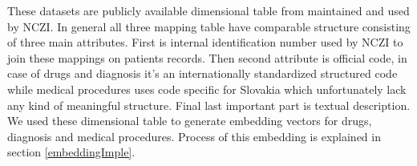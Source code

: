 These datasets are publicly available dimensional table from maintained and used by NCZI. In general all three mapping table have comparable structure consisting of three main attributes. First is internal identification number used by NCZI to join these mappings on patients records. Then second attribute is official code, in case of drugs and diagnosis it's an internationally standardized structured code while medical procedures uses code specific for Slovakia which unfortunately lack any kind of meaningful structure. Final last important part is textual description. 
\\

We used these dimensional table to generate embedding vectors for drugs, diagnosis and medical procedures. Process of this embedding is explained in section \ref{embeddingImple}.    


